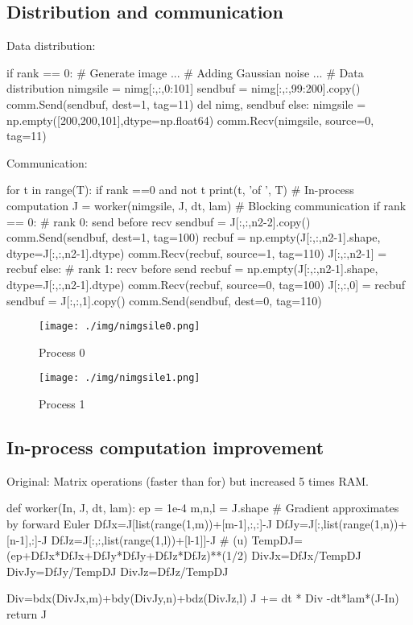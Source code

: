 \documentclass{article}
\begin{document}
\subsection{Distribution and communication}
Data distribution:
\begin{python}
  if rank == 0:
    # Generate image
    ...
    # Adding Gaussian noise
    ...
    # Data distribution 
    nimgsile = nimg[:,:,0:101]
    sendbuf = nimg[:,:,99:200].copy()
    comm.Send(sendbuf, dest=1, tag=11)
    del nimg, sendbuf
  else:
    nimgsile = np.empty([200,200,101],dtype=np.float64)
    comm.Recv(nimgsile, source=0, tag=11)
\end{python}

Communication:
\begin{python}
  for t in range(T):
    if rank ==0 and not t%
      print(t, 'of ', T)
    # In-process computation
    J = worker(nimgsile, J, dt, lam)
    # Blocking communication
    if rank == 0:
      # rank 0: send before recv
      sendbuf = J[:,:,n2-2].copy()
      comm.Send(sendbuf, dest=1, tag=100)
      recbuf = np.empty(J[:,:,n2-1].shape, dtype=J[:,:,n2-1].dtype)	
      comm.Recv(recbuf, source=1, tag=110)	
      J[:,:,n2-1] = recbuf
    else:
      # rank 1: recv before send
      recbuf = np.empty(J[:,:,n2-1].shape, dtype=J[:,:,n2-1].dtype)	
      comm.Recv(recbuf, source=0, tag=100)
      J[:,:,0] = recbuf	
      sendbuf = J[:,:,1].copy()	
      comm.Send(sendbuf, dest=0, tag=110)
\end{python}
\begin{figure}[htp]
\begin{minipage}{0.5\linewidth}
\centering
\texttt{[image: ./img/nimgsile0.png]}
\caption{Process 0}
\label{fig:1a}
\end{minipage}%
\begin{minipage}{0.5\linewidth}
\centering
\texttt{[image: ./img/nimgsile1.png]}
\caption{Process 1}
\label{fig:1b}
\end{minipage}
\end{figure}

\subsection{In-process computation improvement}
Original: Matrix operations (faster than for) but increased 5 times RAM.
\begin{python}
def worker(In, J, dt, lam):
  ep = 1e-4
  m,n,l = J.shape
  # Gradient approximates by forward Euler
  DfJx=J[list(range(1,m))+[m-1],:,:]-J
  DfJy=J[:,list(range(1,n))+[n-1],:]-J
  DfJz=J[:,:,list(range(1,l))+[l-1]]-J
  # \varphi(\nabla u)
  TempDJ=(ep+DfJx*DfJx+DfJy*DfJy+DfJz*DfJz)**(1/2)
  DivJx=DfJx/TempDJ
  DivJy=DfJy/TempDJ
  DivJz=DfJz/TempDJ
  
  Div=bdx(DivJx,m)+bdy(DivJy,n)+bdz(DivJz,l)
  J += dt * Div -dt*lam*(J-In)
  return J
\end{python}
\end{document}
